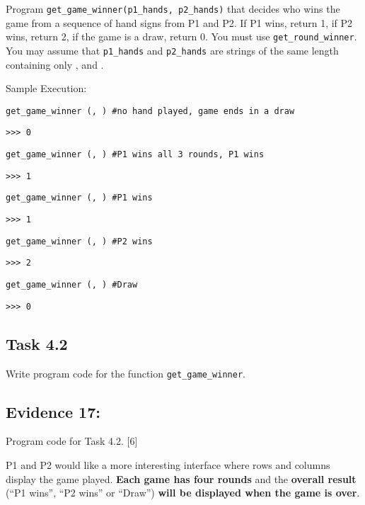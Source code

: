 Program \texttt{get\_game\_winner(p1\_hands, p2\_hands)} that decides
who wins the game from a sequence of hand signs from P1 and P2. If
P1 wins, return 1, if P2 wins, return 2, if the game is a draw, return
0. You must use \texttt{get\_round\_winner}. You may assume that \texttt{p1\_hands}
and \texttt{p2\_hands} are strings of the same length containing only
\textquotedbl , \textquotedbl{} and
\textquotedbl . 

Sample Execution:

\noindent\begin{minipage}[t]{1\columnwidth}%
\texttt{get\_game\_winner (\textquotedbl\textquotedbl , \textquotedbl\textquotedbl )
\#no hand played, game ends in a draw}

\texttt{>\textcompwordmark >\textcompwordmark > 0}

\texttt{get\_game\_winner (\textquotedbl , \textquotedbl )
\#P1 wins all 3 rounds, P1 wins }

\texttt{>\textcompwordmark >\textcompwordmark > 1 }

\texttt{get\_game\_winner (\textquotedbl , \textquotedbl )
\#P1 wins}

\texttt{>\textcompwordmark >\textcompwordmark > 1 }

\texttt{get\_game\_winner (\textquotedbl , \textquotedbl )
\#P2 wins }

\texttt{>\textcompwordmark >\textcompwordmark > 2 }

\texttt{get\_game\_winner (\textquotedbl , \textquotedbl )
\#Draw }

\texttt{>\textcompwordmark >\textcompwordmark > 0 }%
\end{minipage}

\subsection*{Task 4.2 }

Write program code for the function \texttt{get\_game\_winner}. 

\subsection*{Evidence 17: }

Program code for Task 4.2. \hfill{}{[}6{]}

P1 and P2 would like a more interesting interface where rows and columns
display the game played. \textbf{Each game has four rounds} and the
\textbf{overall result} (\textquotedblleft P1 wins\textquotedblright ,
\textquotedblleft P2 wins\textquotedblright{} or \textquotedblleft Draw\textquotedblright )
\textbf{will be displayed when the game is over}. 

